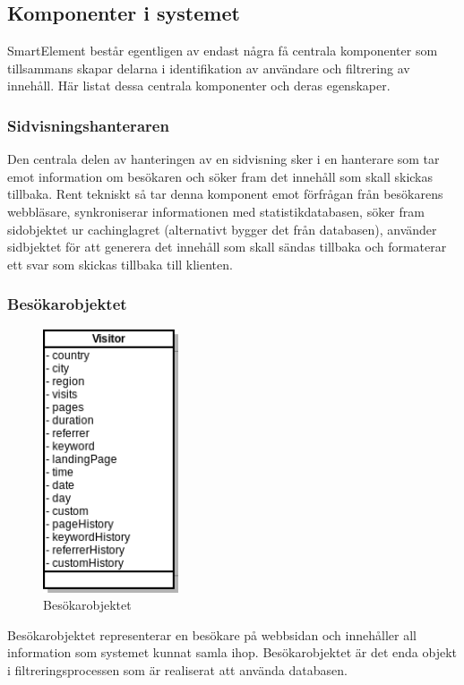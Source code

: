 \subsection{Komponenter i systemet}

SmartElement består egentligen av endast några få centrala komponenter som tillsammans skapar delarna i identifikation av användare och filtrering av innehåll. Här listat dessa centrala komponenter och deras egenskaper.

\subsubsection{Sidvisningshanteraren}

Den centrala delen av hanteringen av en sidvisning sker i en hanterare som tar emot information om besökaren och söker fram det innehåll som skall skickas tillbaka. Rent tekniskt så tar denna komponent emot förfrågan från besökarens webbläsare, synkroniserar informationen med statistikdatabasen, söker fram sidobjektet ur cachinglagret (alternativt bygger det från databasen), använder sidbjektet för att generera det innehåll som skall sändas tillbaka och formaterar ett svar som skickas tillbaka till klienten.

\subsubsection{Besökarobjektet}

\begin{figure}[h!]
\centering
\includegraphics[width=40mm]{assets/images/umlVisitor.png}
\caption{Besökarobjektet}
\label{visitoruml}
\end{figure}

Besökarobjektet representerar en besökare på webbsidan och innehåller all information som systemet kunnat samla ihop. Besökarobjektet är det enda objekt i filtreringsprocessen som är realiserat att använda databasen.


